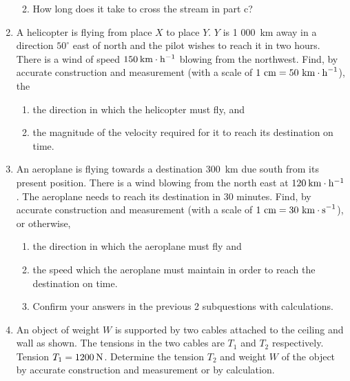 \begin{enumerate}[noitemsep, label=\textbf{\arabic*}. ]
\begin{enumerate}[noitemsep, label=\textbf{\alph*}. ]
\label{m38819*uid127}\item How long does it take to cross the stream in part c?
\end{enumerate}
                \label{m38819*uid128}\item A helicopter is flying from place $X$ to place $Y$. $Y$ is 1 000~km away in a direction ${50}^{\circ }$ east of north and the pilot wishes to reach it in two hours. There is a wind of speed $150\phantom{\rule{2pt}{0ex}}\mathrm{km}\ensuremath{\cdot}\mathrm{h}{}^{-1}$ blowing from the northwest. Find, by accurate construction and measurement (with a scale of $1\phantom{\rule{3.33333pt}{0ex}}\mathrm{cm}=50\phantom{\rule{3.33333pt}{0ex}}{\mathrm{km}\ensuremath{\cdot}\mathrm{h}}^{-1}$), the
\label{m38819*id198505}\begin{enumerate}[noitemsep, label=\textbf{\alph*}. ] 
            \label{m38819*uid129}\item the direction in which the helicopter must fly, and
\label{m38819*uid130}\item the magnitude of the velocity required for it to reach its destination on time.
\end{enumerate}
                \label{m38819*uid131}\item An aeroplane is flying towards a destination 300~km due south from its present position. There is a wind blowing from the north east at $120\phantom{\rule{2pt}{0ex}}\mathrm{km}\ensuremath{\cdot}\mathrm{h}{}^{-1}$. The aeroplane needs to reach its destination in 30 minutes. Find, by accurate construction and measurement (with a scale of $1\phantom{\rule{3.33333pt}{0ex}}\mathrm{cm}=30\phantom{\rule{3.33333pt}{0ex}}{\mathrm{km}\ensuremath{\cdot}\mathrm{s}}^{-1}$), or otherwise,
\label{m38819*id198608}\begin{enumerate}[noitemsep, label=\textbf{\alph*}. ] 
            \label{m38819*uid132}\item the direction in which the aeroplane must fly and
\label{m38819*uid133}\item the speed which the aeroplane must maintain in order to reach the destination on time.
\label{m38819*uid134}\item Confirm your answers in the previous 2 subquestions with calculations.
\end{enumerate}
                \label{m38819*uid135}\item An object of weight $W$ is supported by two cables attached to the ceiling and wall as shown. The tensions in the two cables are ${T}_{1}$ and ${T}_{2}$ respectively. Tension ${T}_{1}=1200\phantom{\rule{2pt}{0ex}}\mathrm{N}$. Determine the tension ${T}_{2}$ and weight $W$ of the object by accurate construction and measurement or by calculation.

\end{enumerate}

